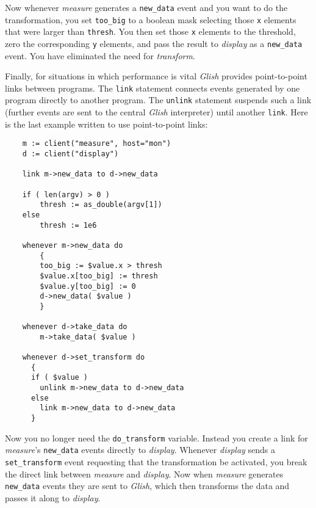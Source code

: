 Now whenever {\em measure} generates a {\tt new\_data} event and
you want to do the transformation, you set {\tt too\_big} to a
boolean mask
selecting those {\tt x} elements that were larger
than {\tt thresh}.  You then set those {\tt x} elements to
the threshold, zero the corresponding {\tt y} elements, and pass
the result to {\em display} as a {\tt new\_data} event.  You have
eliminated the need for {\em transform\/}.

Finally, for situations in which performance is vital {\em Glish} provides
point-to-point links between programs.
The {\tt link} statement
connects events generated by one program directly to
another program.  The {\tt unlink}
statement
suspends such a link
(further events are sent to the central {\em Glish} interpreter) until
another {\tt link}.  Here is the last example written to use
point-to-point links:
\begin{verbatim}
    m := client("measure", host="mon")
    d := client("display")

    link m->new_data to d->new_data

    if ( len(argv) > 0 )
        thresh := as_double(argv[1])
    else
        thresh := 1e6

    whenever m->new_data do
        {
        too_big := $value.x > thresh
        $value.x[too_big] := thresh
        $value.y[too_big] := 0
        d->new_data( $value )
        }

    whenever d->take_data do
        m->take_data( $value )

    whenever d->set_transform do
      {
      if ( $value )
        unlink m->new_data to d->new_data
      else
        link m->new_data to d->new_data
      }
\end{verbatim}
Now you no longer need the {\tt do\_transform} variable.  Instead you
create a link for {\em measure\/}'s {\tt new\_data} events
directly to {\em display\/}.  Whenever {\em display} sends a
{\tt set\_transform} event requesting that the transformation be activated,
you break the direct link between {\em measure} and {\em display}.  Now
when {\em measure} generates {\tt new\_data} events they are sent to
{\em Glish}, which then transforms the data and passes it along to {\em display\/}.


